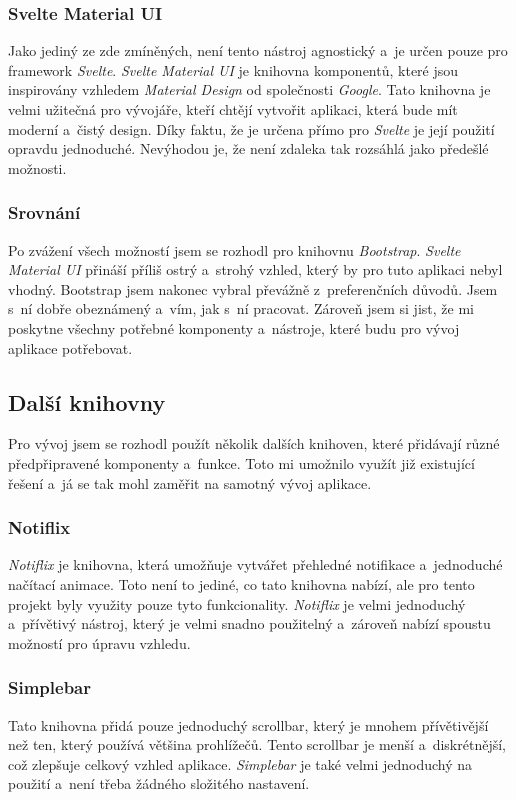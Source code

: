 \subsubsection*{Svelte Material UI}
Jako jediný ze zde zmíněných, není tento nástroj agnostický a~je určen pouze pro framework \textit{Svelte}. \textit{Svelte Material UI} je knihovna komponentů, které jsou inspirovány vzhledem \textit{Material Design} od společnosti \textit{Google}. Tato knihovna je velmi užitečná pro vývojáře, kteří chtějí vytvořit aplikaci, která bude mít moderní a~čistý design. Díky faktu, že je určena přímo pro \textit{Svelte} je její použití opravdu jednoduché. Nevýhodou je, že není zdaleka tak rozsáhlá jako předešlé možnosti. \cite{svelte_material_ui}

\subsubsection*{Srovnání}
Po zvážení všech možností jsem se rozhodl pro knihovnu \textit{Bootstrap}. \textit{Svelte Material UI} přináší příliš ostrý a~strohý vzhled, který by pro tuto aplikaci nebyl vhodný. Bootstrap jsem nakonec vybral převážně z~preferenčních důvodů. Jsem s~ní dobře obeznámený a~vím, jak s~ní pracovat. Zároveň jsem si jist, že mi poskytne všechny potřebné komponenty a~nástroje, které budu pro vývoj aplikace potřebovat.

\subsection{Další knihovny}
Pro vývoj jsem se rozhodl použít několik dalších knihoven, které přidávají různé předpřipravené komponenty a~funkce. Toto mi umožnilo využít již existující řešení a~já se tak mohl zaměřit na samotný vývoj aplikace.

\subsubsection*{Notiflix}
\textit{Notiflix} je knihovna, která umožňuje vytvářet přehledné notifikace a~jednoduché načítací animace. Toto není to jediné, co tato knihovna nabízí, ale pro tento projekt byly využity pouze tyto funkcionality. \textit{Notiflix} je velmi jednoduchý a~přívětivý nástroj, který je velmi snadno použitelný a~zároveň nabízí spoustu možností pro úpravu vzhledu. \cite{notiflix}

\subsubsection*{Simplebar}
Tato knihovna přidá pouze jednoduchý scrollbar, který je mnohem přívětivější než ten, který používá většina prohlížečů. Tento scrollbar je menší a~diskrétnější, což zlepšuje celkový vzhled aplikace. \textit{Simplebar} je také velmi jednoduchý na použití a~není třeba žádného složitého nastavení. \cite{simplebar}

